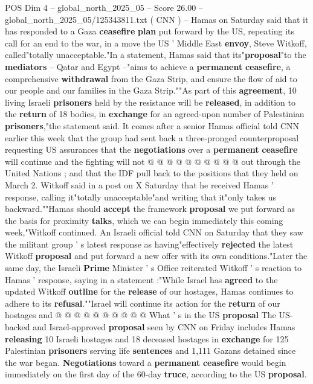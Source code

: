 \begin{textsample}{POS Dim 4 – global\_north\_2025\_05 – Score 26.00 – global\_north\_2025\_05/125343811.txt}  \label{ex:f4_pos_214}
( CNN ) -- Hamas on Saturday said that it has responded to a Gaza \textbf{ceasefire} \textbf{plan} put forward by the US, repeating its call for an end to the war, in a move the US ' Middle East \textbf{envoy}, Steve Witkoff, called"totally unacceptable."In a statement, Hamas said that its"\textbf{proposal}"to the \textbf{mediators} -- Qatar and Egypt --"aims to achieve a \textbf{permanent} \textbf{ceasefire}, a comprehensive \textbf{withdrawal} from the Gaza Strip, and ensure the flow of aid to our people and our families in the Gaza Strip.""As part of this \textbf{agreement}, 10 living Israeli \textbf{prisoners} held by the resistance will be \textbf{released}, in addition to the \textbf{return} of 18 bodies, in \textbf{exchange} for an agreed-upon number of Palestinian \textbf{prisoners},"the statement said.
It comes after a senior Hamas official told CNN earlier this week that the group had sent back a three-pronged counterproposal requesting US assurances that the \textbf{negotiations} over a \textbf{permanent} \textbf{ceasefire} will continue and the fighting will not @ @ @ @ @ @ @ @ @ @ out through the United Nations ; and that the IDF pull back to the positions that they held on March 2.
Witkoff said in a post on X Saturday that he received Hamas ' response, calling it"totally unacceptable"and writing that it"only takes us backward.""Hamas should \textbf{accept} the framework \textbf{proposal} we put forward as the basis for proximity \textbf{talks}, which we can begin immediately this coming week,"Witkoff continued.
An Israeli official told CNN on Saturday that they saw the militant group ' s latest response as having"effectively \textbf{rejected} the latest Witkoff \textbf{proposal} and put forward a new offer with its own conditions."Later the same day, the Israeli \textbf{Prime} Minister ' s Office reiterated Witkoff ' s reaction to Hamas ' response, saying in a statement :"While Israel has \textbf{agreed} to the updated Witkoff \textbf{outline} for the \textbf{release} of our hostages, Hamas continues to adhere to its \textbf{refusal}.""Israel will continue its action for the \textbf{return} of our hostages and @ @ @ @ @ @ @ @ @ @ What ' s in the US \textbf{proposal} The US-backed and Israel-approved \textbf{proposal} seen by CNN on Friday includes Hamas \textbf{releasing} 10 Israeli hostages and 18 deceased hostages in \textbf{exchange} for 125 Palestinian \textbf{prisoners} serving life \textbf{sentences} and 1,111 Gazans detained since the war began. \textbf{Negotiations} toward a \textbf{permanent} \textbf{ceasefire} would begin immediately on the first day of the 60-day \textbf{truce}, according to the US \textbf{proposal}.

\end{textsample}
